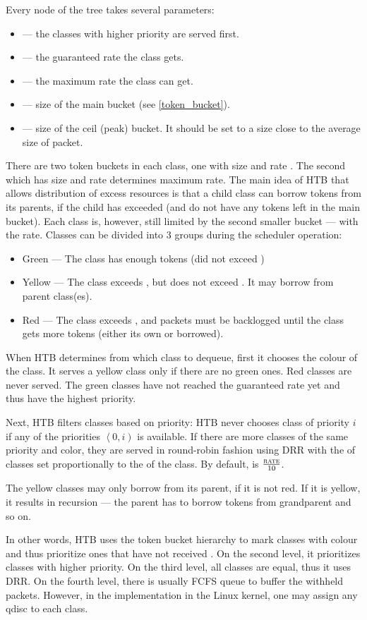 Every node of the tree takes several parameters:
\begin{itemize}
	\item {} --- the classes with higher priority are served first.
	\item {} --- the guaranteed rate the class gets.
	\item {} --- the maximum rate the class can get.
	\item {} --- size of the main bucket (see \ref{token_bucket}).
	\item {} --- size of the ceil (peak) bucket. It should be set to a size close to the average size of packet.
\end{itemize}

There are two token buckets in each class, one with size  and rate . The second which has size  and rate  determines maximum rate. The main idea of HTB that allows distribution of excess resources is that a child class can borrow tokens from its parents, if the child has exceeded  (and do not have any tokens left in the main bucket). Each class is, however, still limited by the second smaller bucket --- with the  rate. Classes can be divided into 3 groups during the scheduler operation:
\begin{itemize}
	\item Green --- The class has enough tokens (did not exceed )
	\item Yellow --- The class exceeds , but does not exceed . It may borrow from parent class(es).
	\item Red --- The class exceeds , and packets must be backlogged until the class gets more tokens (either its own or borrowed).
\end{itemize}


When HTB determines from which class to dequeue, first it chooses the colour of the class. It serves a yellow class only if there are no green ones. Red classes are never served. The green classes have not reached the guaranteed rate yet and thus have the highest priority.

Next, HTB filters classes based on priority: HTB never chooses class of priority $i$ if any of the priorities $\left\langle0,i\right)$ is available. If there are more classes of the same priority and color, they are served in round-robin fashion using DRR with the  of classes set proportionally to the  of the class. By default,  is $\frac{\textsc{rate}}{10}$. 

The yellow classes may only borrow from its parent, if it is not red. If it is yellow, it results in recursion --- the parent has to borrow tokens from grandparent and so on.

In other words, HTB uses the token bucket hierarchy to mark classes with colour and thus prioritize ones that have not received . On the second level, it prioritizes classes with higher priority. On the third level, all classes are equal, thus it uses DRR. On the fourth level, there is usually FCFS queue to buffer the withheld packets. However, in the implementation in the Linux kernel, one may assign any qdisc to each class.

